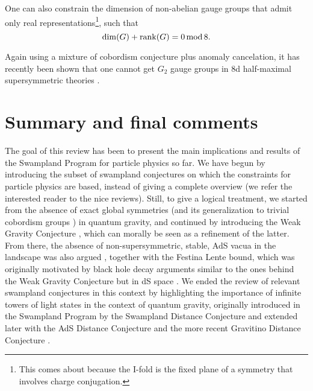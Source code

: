 \documentclass[11pt,a4paper]{article}
\def\be{\begin{equation}}
\def\ee{\end{equation}}
\begin{document}
One can also constrain the dimension of non-abelian gauge groups that admit only real representations\footnote{This comes about because the I-fold is the fixed plane of a symmetry that involves charge conjugation.}, such that
\be
{\rm dim}(G) + {\rm rank}(G)=0 \, {\rm mod} \, 8 .
\ee

Again using a mixture of cobordism conjecture plus anomaly cancelation, it has recently been shown that one cannot get $G_2$ gauge groups in 8d half-maximal supersymmetric theories \cite{Hamada:2021bbz}. 



\section{Summary and final comments}
\label{sec:discussion}


The goal of this review has been to present the main implications and results of the Swampland Program for particle physics so far.  We have begun by introducing the subset of swampland conjectures on which the constraints for particle physics are based, instead of giving a complete overview (we refer the interested reader to the nice reviews\cite{Brennan:2017rbf,Palti:2019pca, vanBeest:2021lhn}). Still, to give a logical treatment, we started from the absence of exact global symmetries \cite{Banks:2010zn} (and its generalization to trivial cobordism groups \cite{McNamara:2019rup}) in quantum gravity, and continued by introducing the Weak Gravity Conjecture \cite{ArkaniHamed:2006dz}, which can morally be seen as a refinement of the latter. From there, the absence of non-supersymmetric, stable, AdS vacua in the landscape was also argued \cite{Ooguri:2016pdq}, together with the Festina Lente bound, which was originally motivated by black hole decay arguments similar to the ones behind the Weak Gravity Conjecture but in dS space \cite{Montero:2019ekk, Montero:2021otb}. We ended the review of relevant swampland conjectures in this context by highlighting the importance of infinite towers of light states in the context of quantum gravity, originally introduced in the Swampland Program by the Swampland Distance Conjecture \cite{Ooguri:2006in} and extended later with the AdS Distance Conjecture \cite{Lust:2019zwm} and the more recent Gravitino Distance Conjecture \cite{Cribiori:2021gbf, Castellano:2021yye}.
\end{document}
